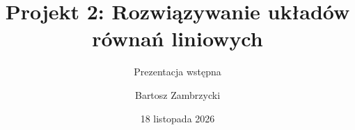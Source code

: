 \documentclass[t,aspectratio=169,11pt]{beamer}
\title{Projekt 2: Rozwiązywanie układów równań liniowych}
\subtitle{Prezentacja wstępna}
\author{Bartosz Zambrzycki}
\institute{Metody numeryczne}
\date{18 listopada 2026}
\begin{document}
\begin{frame}[c]
  \titlepage
\end{frame}





\end{document}
